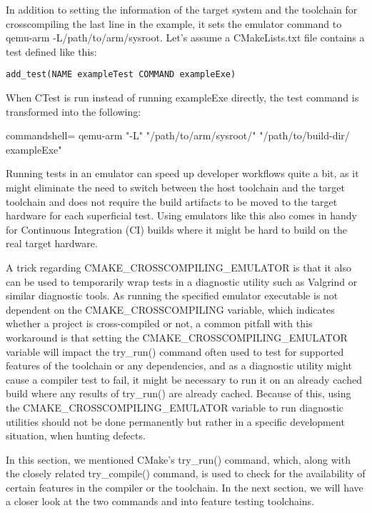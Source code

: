 In addition to setting the information of the target system and the toolchain for crosscompiling the last line in the example, it sets the emulator command to qemu-arm -L/path/to/arm/sysroot. Let's assume a CMakeLists.txt file contains a test defined like this:

\begin{lstlisting}[style=styleCMake]
add_test(NAME exampleTest COMMAND exampleExe)
\end{lstlisting}

When CTest is run instead of running exampleExe directly, the test command is transformed into the following:

\begin{tcblisting}{commandshell={}}
qemu-arm "-L" "/path/to/arm/sysroot/" "/path/to/build-dir/
  exampleExe"
\end{tcblisting}

Running tests in an emulator can speed up developer workflows quite a bit, as it might eliminate the need to switch between the host toolchain and the target toolchain and does not require the build artifacts to be moved to the target hardware for each superficial test. Using emulators like this also comes in handy for Continuous Integration (CI) builds where it might be hard to build on the real target hardware.

A trick regarding CMAKE\_CROSSCOMPILING\_EMULATOR is that it also can be used to temporarily wrap tests in a diagnostic utility such as Valgrind or similar diagnostic tools. As running the specified emulator executable is not dependent on the CMAKE\_CROSSCOMPILING variable, which indicates whether a project is cross-compiled or not, a common pitfall with this workaround is that setting the CMAKE\_CROSSCOMPILING\_EMULATOR variable will impact the try\_run() command often used to test for supported features of the toolchain or any dependencies, and as a diagnostic utility might cause a compiler test to fail, it might be necessary to run it on an already cached build where any results of try\_run() are already cached. Because of this, using the CMAKE\_CROSSCOMPILING\_EMULATOR variable to run diagnostic utilities should not be done permanently but rather in a specific development situation, when hunting defects.

In this section, we mentioned CMake's try\_run() command, which, along with the closely related try\_compile() command, is used to check for the availability of certain features in the compiler or the toolchain. In the next section, we will have a closer look at the two commands and into feature testing toolchains.

